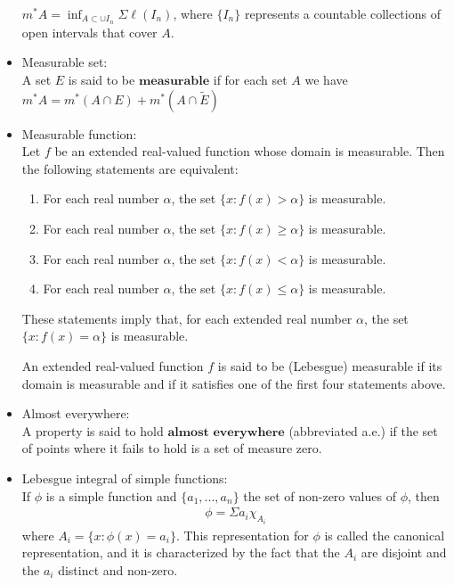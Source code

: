 \documentclass[12pt]{article}
\begin{document}
\begin{itemize}
$m^*A = \inf_{A \subset \cup I_n} \Sigma \ell(I_n)$, where $\{I_n\}$ represents a countable collections of open intervals that cover $A$.
\\
\item Measurable set:\\

A set $E$ is said to be $\textbf{measurable}$ if for each set $A$ we have $m^*A = m^*(A \cap E) + m^*(A \cap \tilde{E})$
\\
\item Measurable function:\\

Let $f$ be an extended real-valued function whose domain is measurable. Then the following statements are equivalent:
\begin{enumerate}
\item For each real number $\alpha$, the set $\{x: f(x) > \alpha\}$ is measurable.
\item For each real number $\alpha$, the set $\{x: f(x) \geq \alpha\}$ is measurable.
\item For each real number $\alpha$, the set $\{x: f(x) < \alpha\}$ is measurable.
\item For each real number $\alpha$, the set $\{x: f(x) \leq \alpha\}$ is measurable.
\end{enumerate}
These statements imply that, for each extended real number $\alpha$, the set $\{x: f(x) = \alpha\}$ is measurable.

An extended real-valued function $f$ is said to be (Lebesgue) measurable if its domain is measurable and if it satisfies one of the first four statements above.
\\
\item Almost everywhere:\\

A property is said to hold $\textbf{almost everywhere}$ (abbreviated a.e.) if the set of points where it fails to hold is a set of measure zero.
\\
\item Lebesgue integral of simple functions:\\

If $\phi$ is a simple function and $\{a_1, ..., a_n\}$ the set of non-zero values of $\phi$, then
\begin{align*}
\phi = \Sigma a_i \chi_{A_i}
\end{align*}
where $A_i = \{x: \phi(x) = a_i\}$. This representation for $\phi$ is called the canonical representation, and it is characterized by the fact that the $A_i$ are disjoint and the $a_i$ distinct and non-zero.


\end{itemize}
\end{document}
